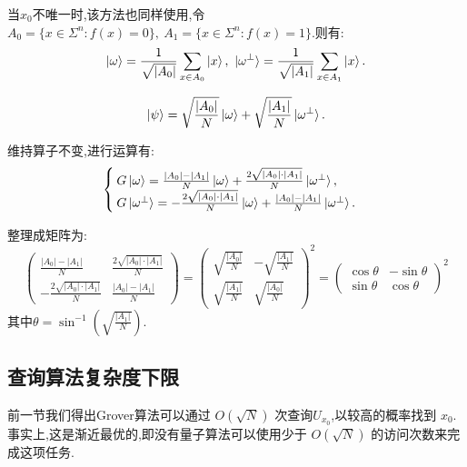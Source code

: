 当$x_0$不唯一时,该方法也同样使用,令$A_0  = \{ x \in \Sigma^n : f(x) = 0 \},~A_1 = \{ x \in \Sigma^n : f(x) = 1 \}$.则有:
\begin{equation}
	\ket{\omega} = \frac{1}{\sqrt{|A_0|}} \sum_{x \in A_0} \ket{x},~\ket{\omega^\bot} = \frac{1}{\sqrt{|A_1|}} \sum_{x \in A_1} \ket{x}.	
\end{equation}

\begin{equation}
	\ket{\psi} = \sqrt{\frac{|A_0|}{N}} \ket{\omega} + \sqrt{\frac{|A_1|}{N}} \ket{\omega^\bot}.
\end{equation}

维持算子不变,进行运算有:
\begin{equation}
	\begin{cases} 
	G\ket{\omega} = \frac{|A_0| - |A_1|}{N} \ket{\omega} + \frac{2\sqrt{|A_0| \cdot |A_1|}}{N} \ket{\omega^\bot},\\
	G\ket{\omega^\bot} = -\frac{2\sqrt{|A_0| \cdot |A_1|}}{N} \ket{\omega} + \frac{|A_0| - |A_1|}{N} \ket{\omega^\bot}.
	\end{cases}
\end{equation}

整理成矩阵为:
\begin{equation}
\begin{pmatrix}
	\frac{|A_0| - |A_1|}{N} & \frac{2\sqrt{|A_0| \cdot |A_1|}}{N} \\
	-\frac{2\sqrt{|A_0| \cdot |A_1|}}{N} & \frac{|A_0| - |A_1|}{N}
\end{pmatrix}
=
\begin{pmatrix}
	\sqrt{\frac{|A_0|}{N}} &
	-\sqrt{\frac{|A_1|}{N}} \\
	\sqrt{\frac{|A_1|}{N}} &
	\sqrt{\frac{|A_0|}{N}}
\end{pmatrix}^2
=
\begin{pmatrix}
	\cos \theta &- \sin \theta \\
	\sin \theta & \cos \theta
\end{pmatrix} ^2
\end{equation}
其中$\theta = \sin^{-1}\left(\sqrt{\frac{|A_1|}{N}}\right)$.

\subsection{查询算法复杂度下限}
前一节我们得出Grover算法可以通过 $O(\sqrt{N})$ 次查询$U_{x_0}$,以较高的概率找到 $x_0$.事实上,这是渐近最优的,即没有量子算法可以使用少于 $O(\sqrt{N})$ 的访问次数来完成这项任务.

